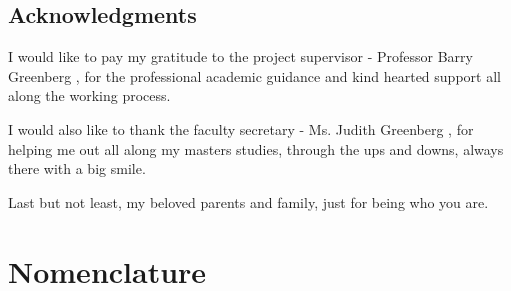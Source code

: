 \documentclass[12pt]{article}
\numberwithin{equation}{section}
\begin{document}
\begin{flushleft}
\subsection*{Acknowledgments} 
I would like to pay my gratitude to the project supervisor - Professor Barry Greenberg , for the professional academic guidance and kind hearted support all along the working process.

I would also like to thank the faculty secretary - Ms. Judith Greenberg , for helping me out all along my masters studies, through the ups and downs, always there with a big smile.



Last but not least, my beloved parents and family, just for being who you are.

\newpage


\section*{Nomenclature} 


\end{flushleft}
\end{document}

